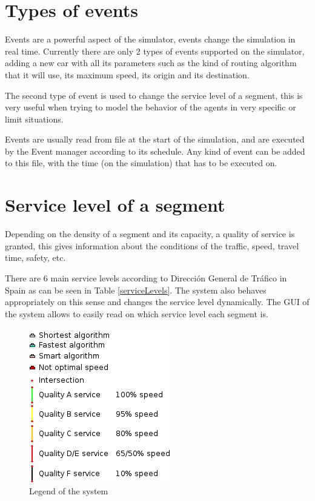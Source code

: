\section{Types of events}

Events are a powerful aspect of the simulator, events change the simulation in real time. Currently there are only 2 types of events supported on the simulator, adding a new car with all its parameters such as the kind of routing algorithm that it will use, its maximum speed, its origin and its destination.

The second type of event is used to change the service level of a segment, this is very useful when trying to model the behavior of the agents in very specific or limit situations.

Events are usually read from file at the start of the simulation, and are executed by the Event manager according to its schedule. Any kind of event can be added to this file, with the time (on the simulation) that has to be executed on.

\section{Service level of a segment}

Depending on the density of a segment and its capacity, a quality of service is granted, this gives information about the conditions of the traffic, speed, travel time, safety, etc.

There are 6 main service levels according to Direcci\'{o}n General de Tr\'{a}fico in Spain as can be seen in Table \ref{serviceLevels}. The system also behaves appropriately on this sense and changes the service level dynamically. The GUI of the system allows to easily read on which service level each segment is.

\begin{figure}[!ht]
  \centering
  \includegraphics[scale=0.8]{images/legend.png} 
  \caption{Legend of the system}
  \label{legend}
\end{figure}

